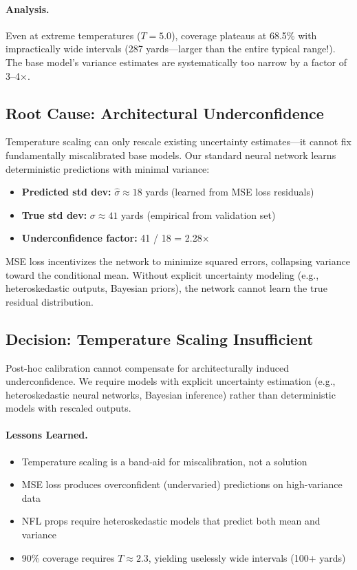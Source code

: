 \paragraph{Analysis.}
Even at extreme temperatures ($T=5.0$), coverage plateaus at 68.5\% with impractically wide intervals (287 yards—larger than the entire typical range!). The base model's variance estimates are systematically too narrow by a factor of 3--4×.

\subsection{Root Cause: Architectural Underconfidence}

Temperature scaling can only rescale existing uncertainty estimates—it cannot fix fundamentally miscalibrated base models. Our standard neural network learns deterministic predictions with minimal variance:

\begin{itemize}
  \item \textbf{Predicted std dev:} $\hat{\sigma} \approx 18$ yards (learned from MSE loss residuals)
  \item \textbf{True std dev:} $\sigma \approx 41$ yards (empirical from validation set)
  \item \textbf{Underconfidence factor:} 41 / 18 = 2.28×
\end{itemize}

MSE loss incentivizes the network to minimize squared errors, collapsing variance toward the conditional mean. Without explicit uncertainty modeling (e.g., heteroskedastic outputs, Bayesian priors), the network cannot learn the true residual distribution.

\subsection{Decision: Temperature Scaling Insufficient}

Post-hoc calibration cannot compensate for architecturally induced underconfidence. We require models with explicit uncertainty estimation (e.g., heteroskedastic neural networks, Bayesian inference) rather than deterministic models with rescaled outputs.

\paragraph{Lessons Learned.}
\begin{itemize}
  \item Temperature scaling is a band-aid for miscalibration, not a solution
  \item MSE loss produces overconfident (undervaried) predictions on high-variance data
  \item NFL props require heteroskedastic models that predict both mean and variance
  \item 90\% coverage requires $T \approx 2.3$, yielding uselessly wide intervals (100+ yards)
\end{itemize}

